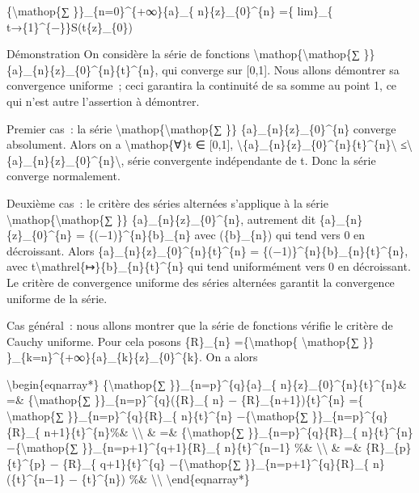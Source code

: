\documentclass[]{article}
\begin{document}
\{\textbackslash{}mathop\{∑ \}\}\_\{n=0\}\^{}\{+∞\}\{a\}\_\{
n\}\{z\}\_\{0\}\^{}\{n\} =\{ lim\}\_\{
t→\{1\}\^{}\{−\}\}S(t\{z\}\_\{0\})

Démonstration On considère la série de fonctions
\textbackslash{}mathop\{\textbackslash{}mathop\{∑ \}\}
\{a\}\_\{n\}\{z\}\_\{0\}\^{}\{n\}\{t\}\^{}\{n\}, qui converge sur
{[}0,1{]}. Nous allons démontrer sa convergence uniforme~; ceci
garantira la continuité de sa somme au point 1, ce qui n'est autre
l'assertion à démontrer.

Premier cas~: la série \textbackslash{}mathop\{\textbackslash{}mathop\{∑
\}\} \{a\}\_\{n\}\{z\}\_\{0\}\^{}\{n\} converge absolument. Alors on a
\textbackslash{}mathop\{∀\}t ∈ {[}0,1{]},
\textbackslash{}\textbar{}\{a\}\_\{n\}\{z\}\_\{0\}\^{}\{n\}\{t\}\^{}\{n\}\textbackslash{}\textbar{}
≤\textbackslash{}\textbar{}
\{a\}\_\{n\}\{z\}\_\{0\}\^{}\{n\}\textbackslash{}\textbar{}, série
convergente indépendante de t. Donc la série converge normalement.

Deuxième cas~: le critère des séries alternées s'applique à la série
\textbackslash{}mathop\{\textbackslash{}mathop\{∑ \}\}
\{a\}\_\{n\}\{z\}\_\{0\}\^{}\{n\}, autrement dit
\{a\}\_\{n\}\{z\}\_\{0\}\^{}\{n\} = \{(−1)\}\^{}\{n\}\{b\}\_\{n\} avec
(\{b\}\_\{n\}) qui tend vers 0 en décroissant. Alors
\{a\}\_\{n\}\{z\}\_\{0\}\^{}\{n\}\{t\}\^{}\{n\} =
\{(−1)\}\^{}\{n\}\{b\}\_\{n\}\{t\}\^{}\{n\}, avec
t\textbackslash{}mathrel\{↦\}\{b\}\_\{n\}\{t\}\^{}\{n\} qui tend
uniformément vers 0 en décroissant. Le critère de convergence uniforme
des séries alternées garantit la convergence uniforme de la série.

Cas général~: nous allons montrer que la série de fonctions vérifie le
critère de Cauchy uniforme. Pour cela posons \{R\}\_\{n\}
=\{\textbackslash{}mathop\{ \textbackslash{}mathop\{∑ \}\}
\}\_\{k=n\}\^{}\{+∞\}\{a\}\_\{k\}\{z\}\_\{0\}\^{}\{k\}. On a alors

\textbackslash{}begin\{eqnarray*\} \{\textbackslash{}mathop\{∑
\}\}\_\{n=p\}\^{}\{q\}\{a\}\_\{ n\}\{z\}\_\{0\}\^{}\{n\}\{t\}\^{}\{n\}\&
=\& \{\textbackslash{}mathop\{∑ \}\}\_\{n=p\}\^{}\{q\}(\{R\}\_\{ n\} −
\{R\}\_\{n+1\})\{t\}\^{}\{n\} =\{ \textbackslash{}mathop\{∑
\}\}\_\{n=p\}\^{}\{q\}\{R\}\_\{ n\}\{t\}\^{}\{n\}
−\{\textbackslash{}mathop\{∑ \}\}\_\{n=p\}\^{}\{q\}\{R\}\_\{
n+1\}\{t\}\^{}\{n\}\%\& \textbackslash{}\textbackslash{} \& =\&
\{\textbackslash{}mathop\{∑ \}\}\_\{n=p\}\^{}\{q\}\{R\}\_\{
n\}\{t\}\^{}\{n\} −\{\textbackslash{}mathop\{∑
\}\}\_\{n=p+1\}\^{}\{q+1\}\{R\}\_\{ n\}\{t\}\^{}\{n−1\} \%\&
\textbackslash{}\textbackslash{} \& =\& \{R\}\_\{p\}\{t\}\^{}\{p\} −
\{R\}\_\{ q+1\}\{t\}\^{}\{q\} −\{\textbackslash{}mathop\{∑
\}\}\_\{n=p+1\}\^{}\{q\}\{R\}\_\{ n\}(\{t\}\^{}\{n−1\} − \{t\}\^{}\{n\})
\%\& \textbackslash{}\textbackslash{} \textbackslash{}end\{eqnarray*\}
\end{document}
